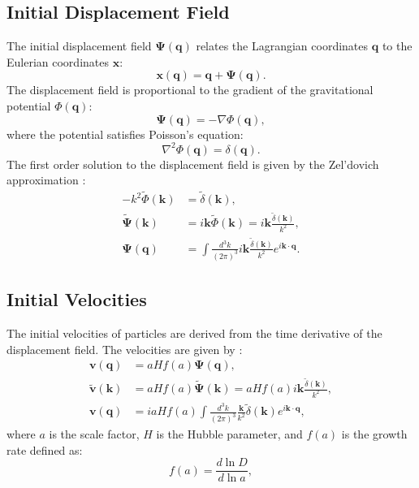 \subsection{Initial Displacement Field}
The initial displacement field $\boldsymbol{\Psi}(\mathbf{q})$ relates the Lagrangian coordinates $\mathbf{q}$ to the Eulerian coordinates $\mathbf{x}$:
\begin{equation}
    \mathbf{x}(\mathbf{q}) = \mathbf{q} + \boldsymbol{\Psi}(\mathbf{q}).
\end{equation}
The displacement field is proportional to the gradient of the gravitational potential $\Phi(\mathbf{q})$:
\begin{equation}
    \boldsymbol{\Psi}(\mathbf{q}) = - \nabla \Phi(\mathbf{q}),
\end{equation}
where the potential satisfies Poisson's equation:
\begin{equation}
    \nabla^2 \Phi(\mathbf{q}) = \delta(\mathbf{q}).
\end{equation}
The first order solution to the displacement field is given by the Zel'dovich approximation \citep{1970A&A.....5...84Z}:
\begin{align}
    -k^2 \tilde{\Phi}(\mathbf{k}) &= \tilde{\delta}(\mathbf{k}), \\
    \tilde{\boldsymbol{\Psi}}(\mathbf{k}) &= i \mathbf{k} \tilde{\Phi}(\mathbf{k}) = i \mathbf{k} \frac{\tilde{\delta}(\mathbf{k})}{k^2}, \\
    \boldsymbol{\Psi}(\mathbf{q}) &= \int \frac{d^3k}{(2\pi)^3} i \mathbf{k} \frac{\tilde{\delta}(\mathbf{k})}{k^2} e^{i\mathbf{k} \cdot \mathbf{q}}.
\end{align}

\subsection{Initial Velocities}
The initial velocities of particles are derived from the time derivative of the displacement field. The velocities are given by \citep{1985ApJS...57..241E}:
\begin{align}
    \mathbf{v}(\mathbf{q}) &= a H f(a) \boldsymbol{\Psi}(\mathbf{q}), \\
    \tilde{\mathbf{v}}(\mathbf{k}) &= a H f(a) \tilde{\boldsymbol{\Psi}}(\mathbf{k}) = a H f(a) i \mathbf{k} \frac{\tilde{\delta}(\mathbf{k})}{k^2}, \\
    \mathbf{v}(\mathbf{q}) &= i a H f(a) \int \frac{d^3k}{(2\pi)^3} \frac{\mathbf{k}}{k^2} \tilde{\delta}(\mathbf{k}) e^{i\mathbf{k} \cdot \mathbf{q}},
\end{align}
where $a$ is the scale factor, $H$ is the Hubble parameter, and $f(a)$ is the growth rate defined as:
\begin{equation}
    f(a) = \frac{d\ln D}{d\ln a},
\end{equation}

